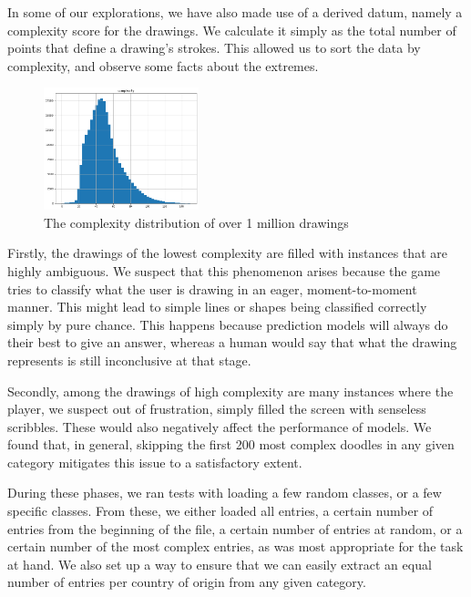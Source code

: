 \documentclass[a4paper, twocolumn]{article}
\begin{document}
In some of our explorations, we have also made use of a derived datum, namely a complexity score for the drawings. We calculate it simply as the total number of points that define a drawing's strokes. This allowed us to sort the data by complexity, and observe some facts about the extremes.

    \begin{figure}[H]
        \centering
        \captionsetup{justification=centering}
        \includegraphics[width=0.4\textwidth]{figures/complexity.png}
        \caption{The complexity distribution of over 1 million drawings}
        \label{fig:complexity}
    \end{figure}

Firstly, the drawings of the lowest complexity are filled with instances that are highly ambiguous. We suspect that this phenomenon arises because the game tries to classify what the user is drawing in an eager, moment-to-moment manner. This might lead to simple lines or shapes being classified correctly simply by pure chance. This happens because prediction models will always do their best to give an answer, whereas a human would say that what the drawing represents is still inconclusive at that stage.

Secondly, among the drawings of high complexity are many instances where the player, we suspect out of frustration, simply filled the screen with senseless scribbles. These would also negatively affect the performance of models. We found that, in general, skipping the first 200 most complex doodles in any given category mitigates this issue to a satisfactory extent.

During these phases, we ran tests with loading a few random classes, or a few specific classes. From these, we either loaded all entries, a certain number of entries from the beginning of the file, a certain number of entries at random, or a certain number of the most complex entries, as was most appropriate for the task at hand. We also set up a way to ensure that we can easily extract an equal number of entries per country of origin from any given category.
\end{document}
